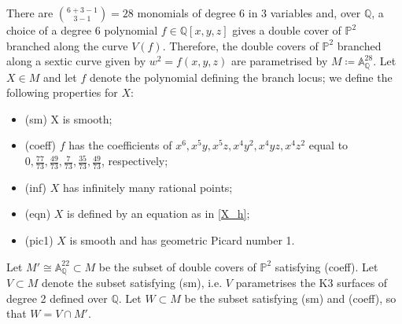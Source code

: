\documentclass[11pt]{amsart}
\newcommand{\QQ}{\mathbb{Q}}
\newcommand{\PP}{\mathbb{P}}
\theoremstyle{plain}
\theoremstyle{remark}
\begin{document}
 
There are ${{6+3-1}\choose{3-1}}=28$ monomials of degree 6 in 3 variables and, over $\QQ$, a choice of a degree 6 polynomial $f\in\QQ[x,y,z]$ gives a double cover of $\PP^2$ branched along the curve $V(f)$. Therefore, the double covers of $\PP^2$ branched along a sextic curve given by $w^2=f(x,y,z)$ are parametrised by $M\coloneqq \mathbb{A}^{28}_\QQ$. Let $X\in M$ and let $f$ denote the polynomial defining the branch locus; we define the following properties for $X$:
\begin{itemize}
    \item (sm) X is smooth;
    \item (coeff) $f$ has the coefficients of $x^6, x^5y, x^5z, x^4y^2, x^4yz, x^4z^2$ equal to $0,\frac{77}{73}, \frac{49}{73}, \frac{7}{73}, \frac{35}{73}, \frac{49}{73}$, respectively;
    \item (inf) $X$ has infinitely many rational points;
    \item (eqn) $X$ is defined by an equation as in \eqref{X_h};
    \item (pic1) $X$ is smooth and has geometric Picard number 1.
\end{itemize}

Let $M'\cong \mathbb{A}^{22}_\QQ\subset M$ be the subset of double covers of $\PP^2$ satisfying (coeff). Let $V\subset M$ denote the subset satisfying (sm), i.e. $V$ parametrises the K3 surfaces of degree 2 defined over $\QQ$. Let $W\subset M$ be the subset satisfying (sm) and (coeff), so that $W=V\cap M'$. 
\end{document}
